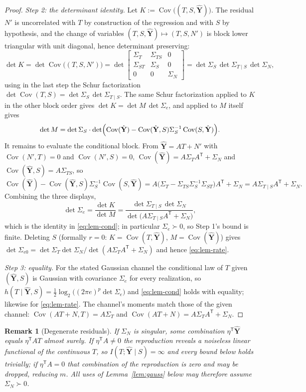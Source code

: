 ﻿\documentclass[11pt,onecolumn]{IEEEtran}
\newtheorem{remark}[theorem]{Remark}
\newcommand{\Cov}{\operatorname{Cov}}
\begin{document}
\begin{proof}
\emph{Step 2: the determinant identity.} Let
$K:=\Cov\bigl((T,S,\hat{\mathbf Y})\bigr)$. The residual $N'$ is
uncorrelated with $T$ by construction of the regression and with $S$ by
hypothesis, and the change of variables
$(T,S,\hat{\mathbf Y})\mapsto(T,S,N')$ is block lower triangular with
unit diagonal, hence determinant preserving:
\[
\det K=\det\Cov\bigl((T,S,N')\bigr)
=\det\begin{bmatrix}
\Sigma_T&\Sigma_{TS}&0\\
\Sigma_{ST}&\Sigma_S&0\\
0&0&\Sigma_N
\end{bmatrix}
=\det\Sigma_S\,\det\Sigma_{T\mid S}\,\det\Sigma_N,
\]
using in the last step the Schur factorization
$\det\Cov(T,S)=\det\Sigma_S\,\det\Sigma_{T\mid S}$. The same Schur
factorization applied to $K$ in the other block order gives
$\det K=\det M\,\det\Sigma_e$, and applied to $M$ itself gives
\[
\det M=\det\Sigma_S\cdot\det\Bigl(\Cov(\hat{\mathbf Y})
-\Cov(\hat{\mathbf Y},S)\Sigma_S^{-1}\Cov(S,\hat{\mathbf Y})\Bigr).
\]
It remains to evaluate the conditional block. From
$\hat{\mathbf Y}=AT+N'$ with $\Cov(N',T)=0$ and $\Cov(N',S)=0$,
$\Cov(\hat{\mathbf Y})=A\Sigma_TA^{\mathsf T}+\Sigma_N$ and
$\Cov(\hat{\mathbf Y},S)=A\Sigma_{TS}$, so
\[
\Cov(\hat{\mathbf Y})-\Cov(\hat{\mathbf Y},S)\Sigma_S^{-1}
\Cov(S,\hat{\mathbf Y})
=A\bigl(\Sigma_T-\Sigma_{TS}\Sigma_S^{-1}\Sigma_{ST}\bigr)A^{\mathsf T}
+\Sigma_N
=A\Sigma_{T\mid S}A^{\mathsf T}+\Sigma_N .
\]
Combining the three displays,
\[
\det\Sigma_e=\frac{\det K}{\det M}
=\frac{\det\Sigma_{T\mid S}\,\det\Sigma_N}
{\det\bigl(A\Sigma_{T\mid S}A^{\mathsf T}+\Sigma_N\bigr)},
\]
which is the identity in \eqref{eq:lem-cond}; in particular
$\Sigma_e\succ0$, so Step 1's bound is finite. Deleting $S$ (formally
$r=0$: $K=\Cov(T,\hat{\mathbf Y})$, $M=\Cov(\hat{\mathbf Y})$) gives
$\det\Sigma_{e0}=\det\Sigma_T\det\Sigma_N/
\det(A\Sigma_TA^{\mathsf T}+\Sigma_N)$ and hence \eqref{eq:lem-rate}.

\emph{Step 3: equality.} For the stated Gaussian channel the conditional
law of $T$ given $(\hat{\mathbf Y},S)$ is Gaussian with covariance
$\Sigma_e$ for every realization, so
$h(T\mid\hat{\mathbf Y},S)=\tfrac12\log_2\bigl((2\pi e)^p
\det\Sigma_e\bigr)$ and \eqref{eq:lem-cond} holds with equality;
likewise for \eqref{eq:lem-rate}. The channel's moments match those of
the given channel: $\Cov(AT+N,T)=A\Sigma_T$ and
$\Cov(AT+N)=A\Sigma_TA^{\mathsf T}+\Sigma_N$.
\end{proof}

\begin{remark}[Degenerate residuals]\label{rem:degenerate}
If $\Sigma_N$ is singular, some combination
$\eta^{\mathsf T}\hat{\mathbf Y}$ equals $\eta^{\mathsf T}AT$ almost
surely. If $\eta^{\mathsf T}A\ne0$ the reproduction reveals a noiseless linear
functional of the continuous $T$, so
$I(T;\hat{\mathbf Y}\mid S)=\infty$ and every bound below holds
trivially; if $\eta^{\mathsf T}A=0$ that combination of the reproduction is
zero and may be dropped, reducing $m$. All uses of
Lemma~\ref{lem:gauss} below may therefore assume $\Sigma_N\succ0$.
\end{remark}
\end{document}
